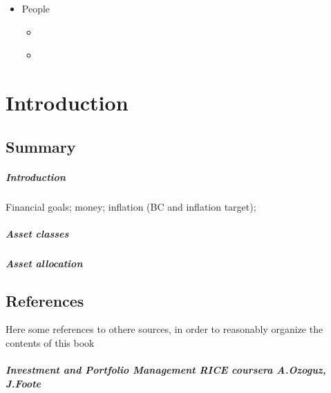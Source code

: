 \documentclass[letterpaper,10pt,english]{jupyterBook}
\begin{document}
\begin{itemize}
\item {} 
\sphinxAtStartPar
People

\begin{itemize}
\item {} 
\sphinxAtStartPar
{\hyperref[\detokenize{ch/people/list::doc}]{}}

\item {} 
\sphinxAtStartPar
{\hyperref[\detokenize{ch/people/the_bull_guests::doc}]{}}

\end{itemize}
\end{itemize}

\sphinxstepscope


\part{Introduction}

\sphinxstepscope


\chapter{Summary}
\label{\detokenize{ch/summary:summary}}\label{\detokenize{ch/summary:fin-edu-summary}}\label{\detokenize{ch/summary::doc}}\subsubsection*{Introduction}

\sphinxAtStartPar
Financial goals; money; inflation (BC and inflation target);
\subsubsection*{Asset classes}
\subsubsection*{Asset allocation}

\sphinxstepscope


\chapter{References}
\label{\detokenize{ch/references:references}}\label{\detokenize{ch/references::doc}}
\sphinxAtStartPar
Here some references to othere sources, in order to reasonably organize the contents of this book
\subsubsection*{Investment and Portfolio Management \sphinxhyphen{} RICE \sphinxhyphen{} coursera \sphinxhyphen{} A.Ozoguz, J.Foote}
\end{document}
